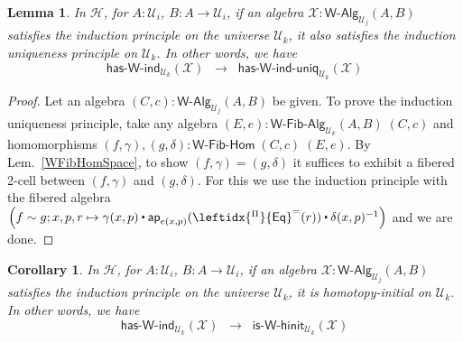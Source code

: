 \documentclass[11pt]{article}
\newcommand{\X}{\mathcal{X}}
\newcommand{\W}{\mathsf{W}}
\newcommand{\funext}{\leftidx{^\Pi}{\mathsf{Eq}}^{=}}
\newcommand{\UU}{\mathcal{U}}
\newcommand{\WAlg}{\mathsf{W}\text{-}\mathsf{Alg}}
\newcommand{\WFibAlg}{\mathsf{W}\text{-}\mathsf{Fib}\text{-}\mathsf{Alg}}
\newcommand{\WFibHom}{\mathsf{W}\text{-}\mathsf{Fib}\text{-}\mathsf{Hom}}
\newcommand{\HasWRec}{\mathsf{has}\text{-}\mathsf{W}\text{-}\mathsf{rec}}
\newcommand{\HasWInd}{\mathsf{has}\text{-}\mathsf{W}\text{-}\mathsf{ind}}
\newcommand{\HasWRecUniq}{\mathsf{has}\text{-}\mathsf{W}\text{-}\mathsf{rec}\text{-}\mathsf{uniq}}
\newcommand{\HasWIndUniq}{\mathsf{has}\text{-}\mathsf{W}\text{-}\mathsf{ind}\text{-}\mathsf{uniq}}
\newcommand{\IsWHInit}{\mathsf{is}\text{-}\mathsf{\W}\text{-}\mathsf{hinit}}
\newcommand{\app}{\mathsf{ap}}
\newcommand{\Hint}{\mathcal{H}}
\newcommand{\ct}{%
  \mathchoice{\mathbin{\raisebox{0.5ex}{$\displaystyle\centerdot$}}}%
             {\mathbin{\raisebox{0.5ex}{$\centerdot$}}}%
             {\mathbin{\raisebox{0.25ex}{$\scriptstyle\,\centerdot\,$}}}%
             {\mathbin{\raisebox{0.1ex}{$\scriptscriptstyle\,\centerdot\,$}}}}
\newtheorem{lemma}[theorem]{Lemma}
\newtheorem{corollary}[theorem]{Corollary}
\theoremstyle{definition}
\begin{document}
\begin{lemma}\label{lem:WIndImpUniqInt}
In $\Hint$, for $A:\UU_i$, $B : A \to \UU_i$, if an algebra $\X : \WAlg_{\UU_j}(A,B)$ satisfies the induction principle on the universe $\UU_k$, it also satisfies the induction uniqueness principle on $\UU_k$. In other words, we have
\[ \HasWInd_{\UU_k}(\X) \;\; \rightarrow \;\; \HasWIndUniq_{\UU_k}(\X) \]
\end{lemma}
\begin{proof}
Let an algebra $(C,c) : \WAlg_{\UU_j}(A,B)$ be given. To prove the induction uniqueness principle, take any algebra $(E,e) : \WFibAlg_{\UU_k}(A,B) \; (C,c)$ and homomorphisms $(f,\gamma), (g,\delta) : \WFibHom \; (C,c) \; (E,e)$. By Lem.~\ref{WFibHomSpace}, to show $(f,\gamma) = (g,\delta)$ it suffices to exhibit a fibered 2-cell between $(f,\gamma)$ and $(g,\delta)$. For this we use the induction principle with the fibered algebra $\Big(f \sim g; x,p,r \mapsto \gamma(x,p) \ct \app_{e(x,p)}(\funext(r)) \ct \delta(x,p)^{-1}\Big)$ and we are done.
\end{proof}


\begin{corollary}\label{lem:WIndImpHInitInt}
In $\Hint$, for $A:\UU_i$, $B : A \to \UU_i$, if an algebra $\X : \WAlg_{\UU_j}(A,B)$ satisfies the induction principle on the universe $\UU_k$, it is homotopy-initial on $\UU_k$. In other words, we have
\[ \HasWInd_{\UU_k}(\X) \;\; \rightarrow \;\; \IsWHInit_{\UU_k}(\X) \]
\end{corollary}
\end{document}
